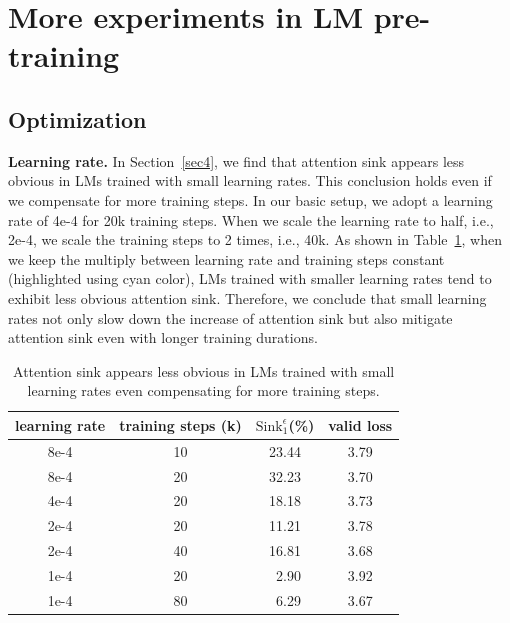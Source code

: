 \documentclass{article} \usepackage{iclr2025_conference,times}
\begin{document}
 \clearpage
\section{More experiments in LM pre-training}\label{appendix_model}

\subsection{Optimization} 

\textbf{Learning rate.} In Section~\ref{sec4}, we find that attention sink appears less obvious in LMs trained with small learning rates. This conclusion holds even if we compensate for more training steps. In our basic setup, we adopt a learning rate of 4e-4 for 20k training steps. When we scale the learning rate to half, i.e., 2e-4, we scale the training steps to 2 times, i.e., 40k.  As shown in Table~\ref{lr}, when we keep the multiply between learning rate and training steps constant (highlighted using cyan color), LMs trained with smaller learning rates tend to exhibit less obvious attention sink. Therefore, we conclude that small learning rates not only slow down the increase of attention sink but also mitigate attention sink even with longer training durations.

\begin{table}[htbp]
\caption{Attention sink appears less obvious in LMs trained with small learning rates even compensating for more training steps.}
\vspace{-.2cm}
\begin{center}
\begin{tabular}{c|ccc}
\toprule
learning rate & training steps (k) & $\textrm{Sink}_1^{\epsilon}$(\%)  & valid loss \\
\midrule
\rowcolor{LightCyan}
8e-4 & 10 & 23.44 & 3.79 \\
8e-4 & 20 & 32.23  & 3.70 \\
\rowcolor{LightCyan}
4e-4 & 20 & 18.18 &  3.73 \\
2e-4 & 20 & 11.21 & 3.78 \\
\rowcolor{LightCyan}
2e-4 & 40 & 16.81 & 3.68 \\ 
1e-4 & 20 & \,\,\,2.90 & 3.92\\
\rowcolor{LightCyan}
1e-4 & 80 & \,\,\,6.29 & 3.67 \\
\bottomrule
\end{tabular}
\end{center}
\vspace{-.2cm}
\label{lr}
\end{table}
\end{document}
